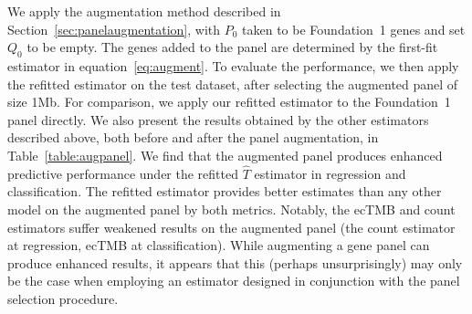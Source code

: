 \documentclass[12pt]{article}
\begin{document}
We apply the augmentation method described in Section~\ref{sec:panelaugmentation}, with $P_0$ taken to be Foundation~1 genes and set $Q_0$ to be empty.  The genes added to the panel are determined by the first-fit estimator in equation~\eqref{eq:augment}. To evaluate the performance, we then apply the refitted estimator on the test dataset, after selecting the augmented panel of size 1Mb. For comparison, we apply our refitted estimator to the Foundation~1 panel directly. We also present the results obtained by the other estimators described above, both before and after the panel augmentation, in Table~\ref{table:augpanel}. We find that the augmented panel produces enhanced predictive performance under the refitted $\hat{T}$ estimator in regression and classification. The refitted estimator provides better estimates than any other model on the augmented panel by both metrics. Notably, the ecTMB and count estimators suffer weakened results on the augmented panel (the count estimator at regression, ecTMB at classification). While augmenting a gene panel can produce enhanced results, it appears that this (perhaps unsurprisingly) may only be the case when employing an estimator designed in conjunction with the panel selection procedure.



\end{document}
